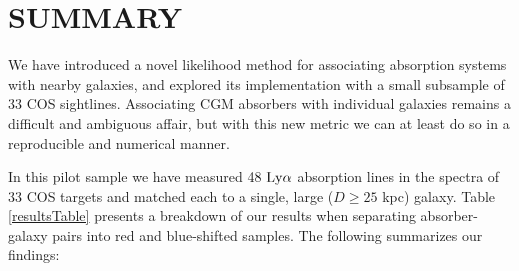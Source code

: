 % 
%

\vspace{5pt}

\section{SUMMARY}

We have introduced a novel likelihood method for associating absorption systems with nearby galaxies, and explored its implementation with a small subsample of 33 COS sightlines. Associating CGM absorbers with individual galaxies remains a difficult and ambiguous affair, but with this new metric we can at least do so in a reproducible and numerical manner. 

In this pilot sample we have measured 48 $\rm Ly\alpha$ absorption lines in the spectra of 33 COS targets and matched each to a single, large ($D\geq 25$ kpc) galaxy. Table \ref{resultsTable} presents a breakdown of our results when separating absorber-galaxy pairs into red and blue-shifted samples. The following summarizes our findings:

